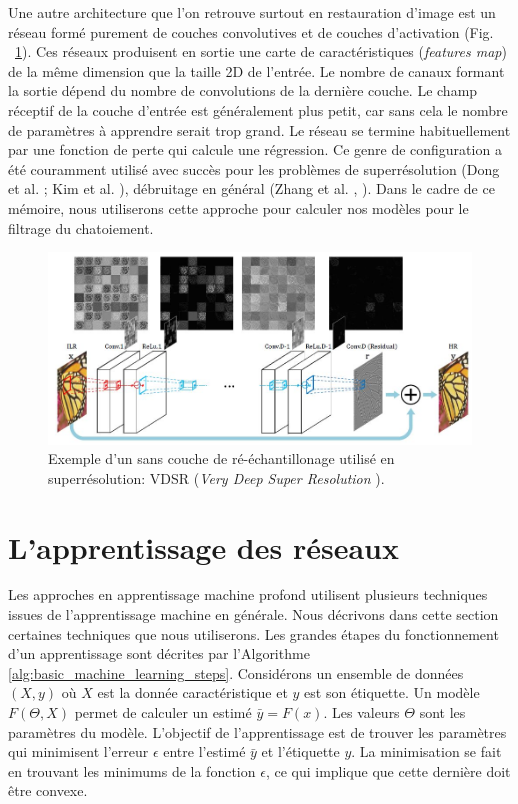 Une autre architecture \acrfcn que l’on retrouve surtout en restauration d’image est un réseau formé purement de couches convolutives et de couches d’activation (Fig. ~\ref{fig:convnet-vdsr-diagram}).  Ces réseaux produisent en sortie une carte de caractéristiques (\textit{features map}) de la même dimension que la taille 2D de l’entrée. Le nombre de canaux formant la sortie dépend du nombre de convolutions de la dernière couche.  Le champ réceptif de la couche d'entrée est généralement plus petit, car sans cela le nombre de paramètres à apprendre serait trop grand. Le réseau se termine habituellement par une fonction de perte qui calcule une régression.  Ce genre de configuration a été couramment utilisé avec succès pour les problèmes de superrésolution (Dong et al. \cite{Dong2016}; Kim et al. \cite{Kim2016}), débruitage en général (Zhang et al. \cite{Zhang2017}, \cite{Zhang2018}).  Dans le cadre de ce mémoire, nous utiliserons cette approche pour calculer nos modèles pour le filtrage du chatoiement.

\begin{figure}[!htbp] 
  \includegraphics[width=\linewidth]{figures/vdsr-diagram.jpg}
   \caption{\small{Exemple d'un \acrfcn sans couche de ré-échantillonage utilisé en superrésolution: VDSR (\textit{Very Deep Super Resolution} \cite{Kim2016} ).  }}
  \label{fig:convnet-vdsr-diagram}
\end{figure}

\section{L'apprentissage des réseaux}

Les approches en apprentissage machine profond utilisent plusieurs techniques issues de l'apprentissage machine en générale.  Nous décrivons dans cette section certaines techniques que nous utiliserons. Les grandes étapes du fonctionnement d'un apprentissage sont décrites par l'Algorithme \ref{alg:basic_machine_learning_steps}. Considérons un ensemble de données $(X, y)$ où $X$ est la donnée caractéristique et $y$ est son étiquette.  Un modèle $F(\Theta, X)$ permet de calculer un estimé $\bar{y} = F(x)$. Les valeurs $\Theta$ sont les paramètres du modèle.  L'objectif de l'apprentissage est de trouver les paramètres qui minimisent l'erreur $\epsilon$ entre l'estimé $\bar{y}$ et l'étiquette $y$. La minimisation se fait en trouvant les minimums de la fonction $\epsilon$, ce qui implique que cette dernière doit être convexe.

